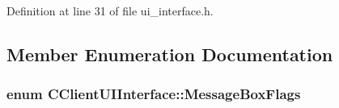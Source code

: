 Definition at line 31 of file ui\+\_\+interface.\+h.



\subsection{Member Enumeration Documentation}
\hypertarget{class_c_client_u_i_interface_a568cf07ecac3fac224d63b42a32e8bc1}{}
\subsubsection[{Message\+Box\+Flags}]{\setlength{\rightskip}{0pt plus 5cm}enum {\bf C\+Client\+U\+I\+Interface\+::\+Message\+Box\+Flags}}\label{class_c_client_u_i_interface_a568cf07ecac3fac224d63b42a32e8bc1}
